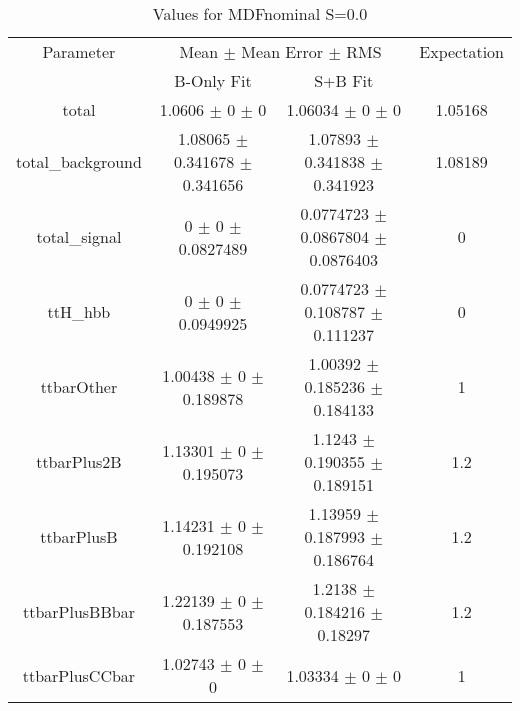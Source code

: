 \begin{table}
\centering
\caption{Values for MDFnominal S=0.0}
\begin{tabular}{cccc}
\toprule
Parameter & \multicolumn{2}{c}{Mean $\pm$ Mean Error $\pm$ RMS} & Expectation\\
 & B-Only Fit & S+B Fit & \\
\midrule
total & \num{1.0606} $\pm$ \num{0} $\pm$ \num{0} & \num{1.06034} $\pm$ \num{0} $\pm$ \num{0} & \num{1.05168}\\
total\_background & \num{1.08065} $\pm$ \num{0.341678} $\pm$ \num{0.341656} & \num{1.07893} $\pm$ \num{0.341838} $\pm$ \num{0.341923} & \num{1.08189}\\
total\_signal & \num{0} $\pm$ \num{0} $\pm$ \num{0.0827489} & \num{0.0774723} $\pm$ \num{0.0867804} $\pm$ \num{0.0876403} & \num{0}\\
ttH\_hbb & \num{0} $\pm$ \num{0} $\pm$ \num{0.0949925} & \num{0.0774723} $\pm$ \num{0.108787} $\pm$ \num{0.111237} & \num{0}\\
ttbarOther & \num{1.00438} $\pm$ \num{0} $\pm$ \num{0.189878} & \num{1.00392} $\pm$ \num{0.185236} $\pm$ \num{0.184133} & \num{1}\\
ttbarPlus2B & \num{1.13301} $\pm$ \num{0} $\pm$ \num{0.195073} & \num{1.1243} $\pm$ \num{0.190355} $\pm$ \num{0.189151} & \num{1.2}\\
ttbarPlusB & \num{1.14231} $\pm$ \num{0} $\pm$ \num{0.192108} & \num{1.13959} $\pm$ \num{0.187993} $\pm$ \num{0.186764} & \num{1.2}\\
ttbarPlusBBbar & \num{1.22139} $\pm$ \num{0} $\pm$ \num{0.187553} & \num{1.2138} $\pm$ \num{0.184216} $\pm$ \num{0.18297} & \num{1.2}\\
ttbarPlusCCbar & \num{1.02743} $\pm$ \num{0} $\pm$ \num{0} & \num{1.03334} $\pm$ \num{0} $\pm$ \num{0} & \num{1}\\
\bottomrule
\end{tabular}
\end{table}